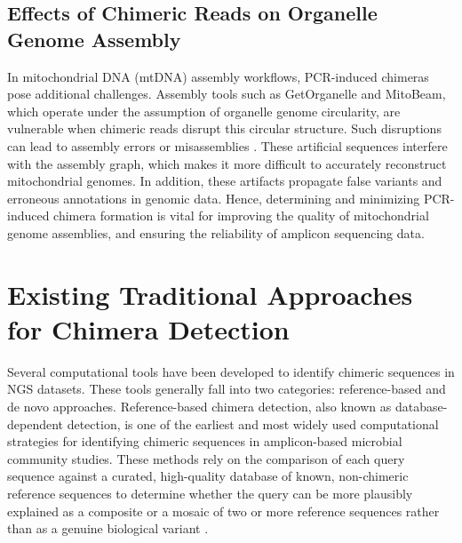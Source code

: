 \subsection{Effects of Chimeric Reads on Organelle Genome Assembly}
In mitochondrial DNA (mtDNA) assembly workflows, PCR-induced chimeras pose additional challenges. Assembly tools such as GetOrganelle and MitoBeam, which operate under the assumption of organelle genome circularity, are vulnerable when chimeric reads disrupt this circular structure. Such disruptions can lead to assembly errors or misassemblies \citep{Bi2024}. These artificial sequences interfere with the assembly graph, which makes it more difficult to accurately reconstruct mitochondrial genomes. In addition, these artifacts propagate false variants and erroneous annotations in genomic data. Hence, determining and minimizing PCR-induced chimera formation is vital for improving the quality of mitochondrial genome assemblies, and ensuring the reliability of amplicon sequencing data.

\clearpage

\section{Existing Traditional Approaches for Chimera Detection}
Several computational tools have been developed to identify chimeric sequences in NGS datasets. These tools generally fall into two categories: reference-based and de novo approaches.
Reference-based chimera detection, also known as database-dependent detection, is one of the earliest and most widely used computational strategies for identifying chimeric sequences in amplicon-based microbial community studies. These methods rely on the comparison of each query sequence against a curated, high-quality database of known, non-chimeric reference sequences to determine whether the query can be more plausibly explained as a composite or a mosaic of two or more reference sequences rather than as a genuine biological variant \citep{Edgar2011}.

